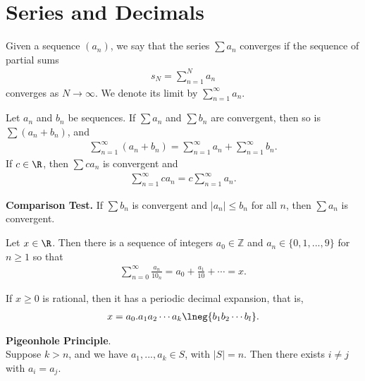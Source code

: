 \documentclass{article}
\begin{document}
\section{Series and Decimals}
\begin{definition}
    Given a sequence $(a_n)$, we say that the series $\sum a_n$ converges if the sequence of partial sums
    \begin{align*}
        s_N=\sum_{n=1}^N a_n
    \end{align*}
    converges as $N\to\infty$. We denote its limit by $\sum_{n=1}^\infty a_n$.
\end{definition}
\begin{theorem}
    Let $a_n$ and $b_n$ be sequences. If $\sum a_n$ and $\sum b_n$ are convergent, then so is $\sum (a_n+b_n)$, and
    \begin{align*}
        \sum_{n=1}^\infty (a_n+b_n) = \sum_{n=1}^\infty a_n+ \sum_{n=1}^\infty b_n.
    \end{align*}
    If $c\in\R$, then $\sum ca_n$ is convergent and
    \begin{align*}
        \sum_{n=1}^\infty ca_n = c\sum_{n=1}^\infty a_n.
    \end{align*}
\end{theorem}
\begin{theorem}
    \textbf{Comparison Test.} If $\sum b_n$ is convergent and $|a_n|\leq b_n$ for all $n$, then $\sum a_n$ is convergent.
\end{theorem}
\begin{theorem}
    Let $x\in\R$. Then there is a sequence of integers $a_0\in\mathbb{Z}$ and $a_n\in\{0,1,...,9\}$ for $n\geq 1$ so that
    \begin{align*}
        \sum_{n=0}^\infty \frac{a_n}{10_n}=a_0+\frac{a_1}{10}+\cdots = x.
    \end{align*}
\end{theorem}
\begin{theorem}
    If $x\geq 0$ is rational, then it has a periodic decimal expansion, that is,
    \begin{align*}
        x=a_0.a_1a_2\cdots a_k\lneg{b_1b_2\cdots b_l}.
    \end{align*}
\end{theorem}
\begin{definition}
    \textbf{Pigeonhole Principle}.\\
    Suppose $k>n$, and we have $a_1,...,a_k\in S$, with $|S|=n$. Then there exists $i\not=j$ with $a_i=a_j$.
\end{definition}
\end{document}
